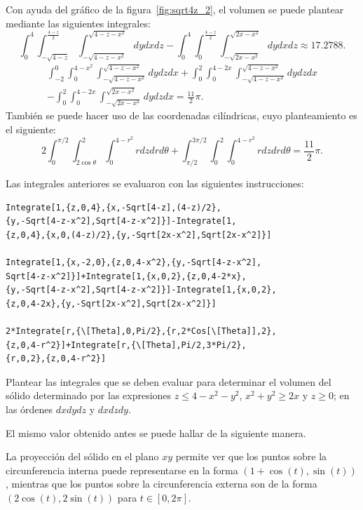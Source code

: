 Con ayuda del gráfico de la figura~\ref{fig:sqrt4z_2}, el volumen se puede plantear mediante las siguientes integrales:
\[\int_{0}^{4}\int_{-\sqrt{4-z}}^{\frac{4-z}{2}}\int_{-\sqrt{4-z-x^2}}^{\sqrt{4-z-x^2}}dydxdz
-\int_{0}^{4}\int_{0}^{\frac{4-z}{2}}\int_{-\sqrt{2x-x^2}}^{\sqrt{2x-x^2}}dydxdz \approx 17.2788.\]
\begin{multline*}
\int_{-2}^{0}\int_{0}^{4-x^2}\int_{-\sqrt{4-z-x^2}}^{\sqrt{4-z-x^2}}dydzdx
+\int_{0}^2\int_{0}^{4-2x}\int_{-\sqrt{4-z-x^2}}^{\sqrt{4-z-x^2}}dydzdx \\
-\int_{0}^2\int_{0}^{4-2x}\int_{-\sqrt{2x-x^2}}^{\sqrt{2x-x^2}}dydzdx = \frac{11}{2}\pi.
\end{multline*}
También se puede hacer uso de las coordenadas cilíndricas, cuyo planteamiento es el siguiente:
\[2 \int_{0}^{\pi /2}\int_{2\cos \theta}^2\int_{0}^{4-r^2}rdzdrd\theta +\int_{\pi /2}^{3\pi
/2}\int_{0}^2\int_{0}^{4-r^2}rdzdrd\theta = \frac{11}{2}\pi. \]

Las integrales anteriores se evaluaron con las siguientes instrucciones:

\begin{tcolorbox}[title=\bf Instrucción en \verb"Mathematica"]\begin{Verbatim}[formatcom=\letraverbatim]
Integrate[1,{z,0,4},{x,-Sqrt[4-z],(4-z)/2},
{y,-Sqrt[4-z-x^2],Sqrt[4-z-x^2]}]-Integrate[1,
{z,0,4},{x,0,(4-z)/2},{y,-Sqrt[2x-x^2],Sqrt[2x-x^2]}]

Integrate[1,{x,-2,0},{z,0,4-x^2},{y,-Sqrt[4-z-x^2],
Sqrt[4-z-x^2]}]+Integrate[1,{x,0,2},{z,0,4-2*x},
{y,-Sqrt[4-z-x^2],Sqrt[4-z-x^2]}]-Integrate[1,{x,0,2},
{z,0,4-2x},{y,-Sqrt[2x-x^2],Sqrt[2x-x^2]}]

2*Integrate[r,{\[Theta],0,Pi/2},{r,2*Cos[\[Theta]],2},
{z,0,4-r^2}]+Integrate[r,{\[Theta],Pi/2,3*Pi/2},
{r,0,2},{z,0,4-r^2}]
\end{Verbatim}
\end{tcolorbox}

\begin{ejer}
Plantear las integrales que se deben evaluar para determinar el volumen del sólido determinado por las expresiones $z\leq 4-x^2-y^2$, $x^2+y^2 \geq 2x$ y $z \geq 0$;
en las órdenes $dxdydz$ y $dxdzdy$.
\end{ejer}

El mismo valor obtenido antes se puede hallar de la siguiente manera.

La proyección del sólido en el plano $xy$ permite ver que los puntos sobre la circunferencia interna puede representarse en la forma
$(1+\cos(t),\sin(t))$, mientras que los puntos sobre la circunferencia externa son de la forma
$(2\cos(t),2\sin(t))$ para $t\in [0,2\pi]$.


